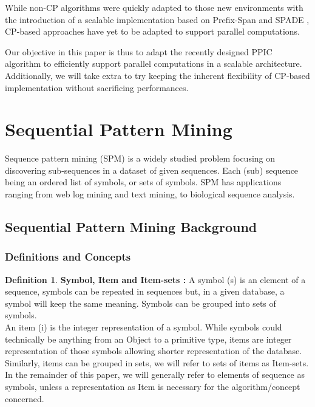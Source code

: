 \documentclass{eplmastersthesis}
\begin{document}
While non-CP algorithms were quickly adapted to those new environments with the introduction of a scalable implementation based on Prefix-Span \cite{deng2014towards} and SPADE \cite{ho2000large}, CP-based approaches have yet to be adapted to support parallel computations. \newline

Our objective in this paper is thus to adapt the recently designed PPIC algorithm to efficiently support parallel computations in a scalable architecture. Additionally, we will take extra to try keeping the inherent flexibility of CP-based implementation without sacrificing performances.

\section{Sequential Pattern Mining}

Sequence pattern mining (SPM) is a widely studied problem focusing on discovering sub-sequences in a dataset of given sequences. Each (sub) sequence being an ordered list of symbols, or sets of symbols. SPM has applications ranging from web log mining and text mining, to biological sequence analysis.

\subsection{Sequential Pattern Mining Background}

\subsubsection{Definitions and Concepts}

\theoremstyle{definition}
\newtheorem{definition}{Definition}[]

\theoremstyle{example}
\newtheorem{example}{Example}[]

\begin{definition}{\bfseries Symbol, Item and Item-sets :}
A symbol (s) is an element of a sequence, symbols can be repeated in sequences but, in a given database, a symbol will keep the same meaning. Symbols can be grouped into sets of symbols. \\
An item (i) is the integer representation of a symbol. While symbols could technically be anything from an Object to a primitive type, items are integer representation of those symbols allowing shorter representation of the database. Similarly, items can be grouped in sets, we will refer to sets of items as Item-sets. \\
In the remainder of this paper, we will generally refer to elements of sequence as symbols, unless a representation as Item is necessary for the algorithm/concept concerned.
\end{definition}
\end{document}
